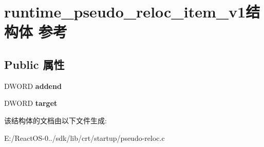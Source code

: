 \hypertarget{structruntime__pseudo__reloc__item__v1}{}\section{runtime\+\_\+pseudo\+\_\+reloc\+\_\+item\+\_\+v1结构体 参考}
\label{structruntime__pseudo__reloc__item__v1}
\subsection*{Public 属性}
\begin{DoxyCompactItemize}
\item 
\mbox{\label{structruntime__pseudo__reloc__item__v1_a8d6f7c6af371b9ab746169fd46e4e357}} 
D\+W\+O\+RD {\bfseries addend}
\item 
\mbox{\label{structruntime__pseudo__reloc__item__v1_a7f19c3f083d6573018d9486e0da56f85}} 
D\+W\+O\+RD {\bfseries target}
\end{DoxyCompactItemize}


该结构体的文档由以下文件生成\+:\begin{DoxyCompactItemize}
\item 
E\+:/\+React\+O\+S-\/0../sdk/lib/crt/startup/pseudo-\/reloc.\+c\end{DoxyCompactItemize}
